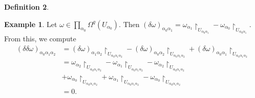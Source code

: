 \documentclass[10pt,letterpaper,cm]{nupset}
\theoremstyle{definition}
\newtheorem{definition}{Definition}[subsection]
\newtheorem{exmp}[definition]{Example}
\theoremstyle{theorem}
\theoremstyle{remark}
\newcommand{\1}{\mathbb{1}}
\newcommand{\0}{\vec 0}
\begin{document}
\begin{definition}
\begin{exmp}
Let $\omega \in \prod_{\alpha_0} \Omega^q (U_{\alpha_0})$. Then $\left(\delta{\omega}\right)_{\alpha_0{\alpha_1}} =\omega_{\alpha_1}\restriction_{U_{\alpha_0{\alpha_1}}} -\omega_{\alpha_0}\restriction_{U_{\alpha_0{\alpha_1}}}$. From this, we compute 
\begin{align*}
\left(\delta{\delta{\omega}}\right)_{\alpha_0{\alpha_1}{\alpha_2}} & = \left(\delta{\omega}\right)_{\alpha_1{\alpha_2}} \restriction_{U_{{\alpha_0}{\alpha_1}{\alpha_2}}} -  \left(\delta{\omega}\right)_{\alpha_0{\alpha_2}} \restriction_{U_{{\alpha_0}{\alpha_1}{\alpha_2}}} +  \left(\delta{\omega}\right)_{\alpha_0{\alpha_1}} \restriction_{U_{{\alpha_0}{\alpha_1}{\alpha_2}}}
\\ & = \omega_{\alpha_2} \restriction_{U_{{\alpha_0}{\alpha_1}{\alpha_2}}}  - \omega_{\alpha_1} \restriction_{U_{{\alpha_0}{\alpha_1}{\alpha_2}}} - \omega_{\alpha_2} \restriction_{U_{{\alpha_0}{\alpha_1}{\alpha_2}}} 
\\ & + \omega_{\alpha_0}  \restriction_{U_{{\alpha_0}{\alpha_1}{\alpha_2}}} + \omega_{\alpha_1} \restriction_{U_{{\alpha_0}{\alpha_1}{\alpha_2}}} - \omega_{\alpha_0} \restriction_{U_{{\alpha_0}{\alpha_1}{\alpha_2}}} 
\\ & = 0.
\end{align*}
\end{exmp}

\medskip


\end{definition}
\end{document}
